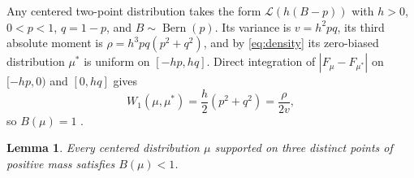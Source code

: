 \documentclass[11pt]{article}
\numberwithin{equation}{section}
\newtheorem{lemma}[theorem]{Lemma}
\theoremstyle{remark}
\DeclareMathOperator{\Bern}{Bern}
\newcommand{\Law}{\mathcal L}
\begin{document}
Any centered two-point distribution takes the form $\Law(h(B-p))$ with $h>0$,
$0<p<1$, $q=1-p$, and $B\sim\Bern(p)$. Its variance is $v=h^2pq$, its third
absolute moment is $\rho=h^3pq(p^2+q^2)$, and by \eqref{eq:density} its
zero-biased distribution $\mu^*$ is uniform on $[-hp,hq]$. Direct integration
of $|F_\mu-F_{\mu^*}|$ on $[-hp,0)$ and $[0,hq]$ gives
\begin{equation}\label{eq:binary-transport}
                 W_1(\mu,\mu^*)=\frac h2(p^2+q^2)=\frac{\rho}{2v},
\end{equation}
so $B(\mu)=1$ \citep[Lemma~1.2]{Goldstein2010}.

\begin{lemma}\label{lem:strict-ternary}
Every centered distribution $\mu$ supported on three distinct points of
positive mass satisfies $B(\mu)<1$.
\end{lemma}
\end{document}
